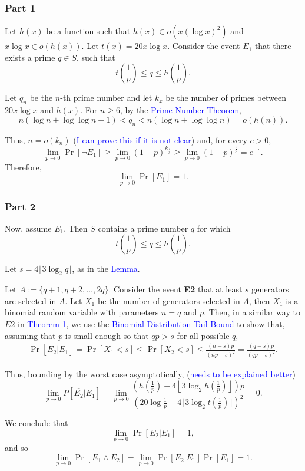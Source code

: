 \subsubsection*{Part 1}
Let \(h(x)\) be a function such that \(h(x) \in o(x (\log x)^2)\) and \(x\log x \in o(h(x))\). Let $t(x) = 20x \log x$. Consider the event
$E_1$ that there exists a prime $q \in S$, such that 
\[t\left(\frac{1}{p}\right) \leq q \leq h\left(\frac{1}{p}\right).\]
\par 
Let $q_n$ be the $n$-th prime number and let $k_x$ be the number of primes between $20x\log x$ and $h(x)$. For $n \geq 6$, by the \textcolor{blue}{Prime Number Theorem}, 
\[n(\log n + \log \log n - 1) < q_n < n(\log n + \log\log n) = o(h(n)).\]

\par Thus, $n = o(k_n)$ (\textcolor{blue}{I can prove this if it is not clear}) and, for every $c > 0$,  
\[\lim_{p \to 0}\Pr[\lnot E_1] \geq \lim_{p \to 0} (1 - p)^{k_{\frac{1}{p}}} \geq \lim_{p \to 0} (1 - p)^{\frac{c}{p}} = e^{-c}.\]
Therefore, 
\[\lim_{p \to 0}\Pr[E_1] = 1.\]
\subsubsection*{Part 2}

Now, assume $E_1$. Then $S$ contains a prime number $q$ for which 
\[t\left(\frac{1}{p}\right) \leq q \leq h\left(\frac{1}{p}\right).\]
\par Let $s = 4\lfloor3\log_2 q \rfloor$, as in the \textcolor{blue}{Lemma}. 
\par Let $A := \{q + 1, q + 2, \ldots,  2q\}$. Consider the event \textbf{E2} that at least $s$ generators are selected in $A$. Let $X_1$ be the number of generators selected in $A$, then $X_1$ is a binomial random variable with parameters $n = q$ and $p$. Then, in a similar way to $E2$ in \textcolor{blue}{Theorem 1}, we use the \textcolor{blue}{Binomial Distribution Tail Bound} to show that, assuming that $p$ is small enough so that $qp > s$ for all possible $q$,
\begin{align*}
    \Pr[ \overline{E_2}  | E_1] = \Pr\left[X_1 < s\right] \leq \Pr\left[X_2 < s\right] \leq \frac{(n - s)p}{(np - s)^2} = \frac{(q - s)p}{(qp - s)^2}.
\end{align*}
\par Thus, bounding by the worst case asymptotically, (\textcolor{blue}{needs to be explained better})
\[\lim_{p \to 0} P[\overline{E_2} | E_1] =  \lim_{p \to 0}\frac{\left(h\left(\frac{1}{p}\right) - 4\left\lfloor3\log_2 h\left(\frac{1}{p}\right) \right\rfloor\right)p}{\left(20 \log \frac{1}{p} - 4\lfloor3\log_2 t\left(\frac{1}{p}\right) \rfloor\right)^2} = 0.\]
\par We conclude that
\[\lim_{p \to 0} \Pr[E_2 | E_1] = 1,\]
and so
\[\lim_{p \to 0} \Pr[E_1 \land E_2] = \lim_{p \to 0} \Pr[E_2  | E_1]\Pr[E_1] = 1.\]


